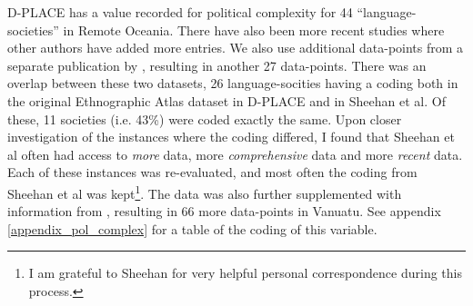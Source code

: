 \documentclass[unnumsec,webpdf,modern,medium]{oup-authoring-template}
\begin{document}
D-PLACE has a value recorded for political complexity for 44 ``language-societies'' in Remote Oceania. There have also been more recent studies where other authors have added more entries. We also use additional data-points from a separate publication by \citet{sheehan2018coevolution}, resulting in another 27 data-points. There was an overlap between these two datasets, 26 language-socities having a coding both in the original Ethnographic Atlas dataset in D-PLACE and in Sheehan et al. Of these, 11 societies (i.e. 43\%) were coded exactly the same. Upon closer investigation of the instances where the coding differed, I found that Sheehan et al often had access to \textit{more} data, more \textit{comprehensive} data and more \textit{recent} data. Each of these instances was re-evaluated, and most often the coding from Sheehan et al was kept\footnote{I am grateful to Sheehan for very helpful personal correspondence during this process.}. The data was also further supplemented with information from \citet[201]{bonnemaison1996graded}, resulting in 66 more data-points in Vanuatu. See appendix \ref{appendix_pol_complex} for a table of the coding of this variable.


\end{document}
